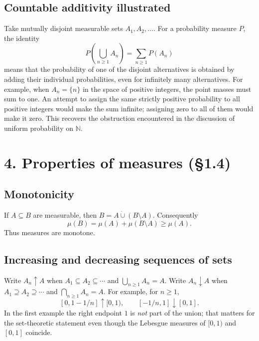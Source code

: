 \documentclass[10pt,a4paper]{article}
\newcommand{\N}{\mathbb N}\newcommand{\Q}{\mathbb Q}\newcommand{\R}{\mathbb R}
\begin{document}
\subsection*{Countable additivity illustrated}
Take mutually disjoint measurable sets $A_1,A_2,\ldots$. For a probability measure $P$, the identity
\[
P\!\left(\bigcup_{n\ge1}A_n\right)=\sum_{n\ge1}P(A_n)
\]
means that the probability of one of the disjoint alternatives is obtained by adding their individual probabilities, even for infinitely many alternatives. For example, when $A_n=\{n\}$ in the space of positive integers, the point masses must sum to one. An attempt to assign the same strictly positive probability to all positive integers would make the sum infinite; assigning zero to all of them would make it zero. This recovers the obstruction encountered in the discussion of uniform probability on $\N$.

\section*{4. Properties of measures (\S1.4)}
\subsection*{Monotonicity}
If $A\subseteq B$ are measurable, then $B=A\mathbin{\dot\cup}(B\setminus A)$. Consequently
\[
\mu(B)=\mu(A)+\mu(B\setminus A)\ge\mu(A).
\]
Thus measures are monotone.

\subsection*{Increasing and decreasing sequences of sets}
Write $A_n\uparrow A$ when $A_1\subseteq A_2\subseteq\cdots$ and $\bigcup_{n\ge1}A_n=A$. Write $A_n\downarrow A$ when $A_1\supseteq A_2\supseteq\cdots$ and $\bigcap_{n\ge1}A_n=A$. For example, for $n\ge1$,
\[
[0,1-1/n]\uparrow[0,1),\qquad
[-1/n,1]\downarrow[0,1].
\]
In the first example the right endpoint $1$ is \emph{not} part of the union; that matters for the set-theoretic statement even though the Lebesgue measures of $[0,1)$ and $[0,1]$ coincide.
\end{document}
